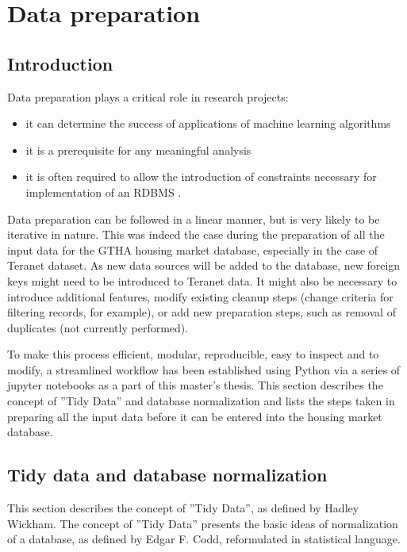 \chapter{Data preparation} \label{ch:data_preparation}

\section{Introduction} \label{sec:data_preparation_intro}

Data preparation plays a critical role in research projects:

\begin{itemize}
    \item it can determine the success of applications of machine learning algorithms
    \item it is a prerequisite for any meaningful analysis
    \item it is often required to allow the introduction of constraints necessary for implementation of an RDBMS .
\end{itemize}

Data preparation can be followed in a linear manner, but is very likely to be iterative in nature\cite{Brownlee2013}.
This was indeed the case during the preparation of all the input data for the GTHA housing market database, especially in the case of Teranet dataset.
As new data sources will be added to the database, new foreign keys might need to be introduced to Teranet data.
It might also be necessary to introduce additional features, modify existing cleanup steps (change criteria for filtering records, for example), or add new preparation steps, such as removal of duplicates (not currently performed).

To make this process efficient, modular, reproducible, easy to inspect and to modify, a streamlined workflow has been established using Python via a series of jupyter notebooks as a part of this master's thesis.
This section describes the concept of ''Tidy Data'' and database normalization and lists the steps taken in preparing all the input data before it can be entered into the housing market database.

\section{Tidy data and database normalization} \label{sec:db_norm_tidy_data}

This section describes the concept of ''Tidy Data'', as defined by Hadley Wickham.
The concept of ''Tidy Data'' presents the basic ideas of normalization of a database, as defined by Edgar F. Codd, reformulated in statistical language.

